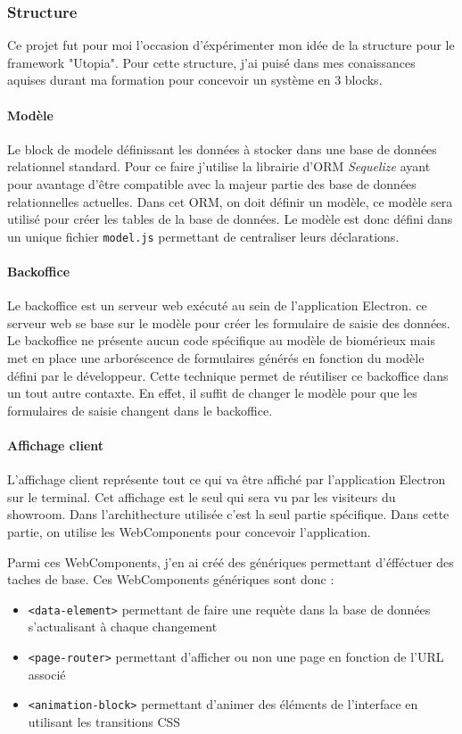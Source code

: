 \documentclass{article}
\begin{document}
\subsubsection{Structure}

Ce projet fut pour moi l'occasion d'éxpérimenter mon idée de la structure pour le framework "Utopia".
Pour cette structure, j'ai puisé dans mes conaissances aquises durant ma formation pour concevoir un système en 3 blocks.

\paragraph{Modèle} Le block de modele définissant les données à stocker dans une base de données relationnel standard.
Pour ce faire j'utilise la librairie d'ORM \emph{Sequelize} ayant pour avantage d'être compatible avec la majeur partie des base de données relationnelles actuelles.
Dans cet ORM, on doit définir un modèle, ce modèle sera utilisé pour créer les tables de la base de données.
Le modèle est donc défini dans un unique fichier \texttt{model.js} permettant de centraliser leurs déclarations.

\paragraph{Backoffice} Le backoffice est un serveur web exécuté au sein de l'application Electron.
ce serveur web se base sur le modèle pour créer les formulaire de saisie des données.
Le backoffice ne présente aucun code spécifique au modèle de biomérieux mais met en place une arboréscence de formulaires générés en fonction du modèle défini par le développeur.
Cette technique permet de réutiliser ce backoffice dans un tout autre contaxte.
En effet, il suffit de changer le modèle pour que les formulaires de saisie changent dans le backoffice.

\paragraph{Affichage client} L'affichage client représente tout ce qui va être affiché par l'application Electron sur le terminal.
Cet affichage est le seul qui sera vu par les visiteurs du showroom.
Dans l'archithecture utilisée c'est la seul partie spécifique.
Dans cette partie, on utilise les WebComponents pour concevoir l'application.

Parmi ces WebComponents, j'en ai créé des génériques permettant d'éfféctuer des taches de base.
Ces WebComponents génériques sont donc :
\begin{itemize}
    \item \texttt{<data-element>} permettant de faire une requète dans la base de données s'actualisant à chaque changement
    \item \texttt{<page-router>} permettant d'afficher ou non une page en fonction de l'URL associé
    \item \texttt{<animation-block>} permettant d'animer des éléments de l'interface en utilisant les transitions CSS
\end{itemize}
\end{document}
